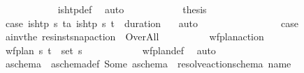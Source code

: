 \begin{isabellebody}
\ \ \ \ \ \ \ \ \ \ \isamarkupfalse%
\ is{\isacharunderscore}{\kern0pt}htp{\isacharunderscore}{\kern0pt}def\ \isamarkupfalse%
\ auto\isanewline
\ \ \ \ \ \ \ \ \isamarkupfalse%
\ \isamarkupfalse%
\ {\isacharquery}{\kern0pt}thesis\isanewline
\ \ \ \ \ \ \ \ \ \ \isamarkupfalse%
\ {\isacartoucheopen}{\isacharquery}{\kern0pt}case{}{\isacartoucheclose}\ {\isacartoucheopen}{\isasymnot}is{\isacharunderscore}{\kern0pt}htp\ {\isasympi}s\ t\isactrlsub a{\isacartoucheclose}\ {\isacartoucheopen}is{\isacharunderscore}{\kern0pt}htp\ {\isasympi}s\ {\isacharparenleft}{\kern0pt}t\isactrlsub {\isasympi}\ {\isacharplus}{\kern0pt}\ {\isacharparenleft}{\kern0pt}duration\ {\isasympi}{\isacharparenright}{\kern0pt}{\isacharparenright}{\kern0pt}{\isacartoucheclose}\ \isamarkupfalse%
\ auto\isanewline
\ \ \ \ \ \ \isamarkupfalse%
\isanewline
\ \ \ \ \ \ \ \ \isamarkupfalse%
\ {\isacharquery}{\kern0pt}case{}\isanewline
\ \ \ \ \ \ \ \ \isamarkupfalse%
\ {\isacharquery}{\kern0pt}a\isactrlsub i\isactrlsub n\isactrlsub v{\isacharequal}{\kern0pt}{\isachardoublequoteopen}the\ {\isacharparenleft}{\kern0pt}res{\isacharunderscore}{\kern0pt}inst{\isacharunderscore}{\kern0pt}snap{\isacharunderscore}{\kern0pt}action\ {\isasympi}\ Over{\isacharunderscore}{\kern0pt}All{\isacharparenright}{\kern0pt}{\isachardoublequoteclose}\isanewline
\ \ \ \ \ \ \ \ \isamarkupfalse%
\ {\isachardoublequoteopen}wf{\isacharunderscore}{\kern0pt}plan{\isacharunderscore}{\kern0pt}action\ {\isasympi}{\isachardoublequoteclose}\isanewline
\ \ \ \ \ \ \ \ \ \ \isamarkupfalse%
\ {\isacartoucheopen}wf{\isacharunderscore}{\kern0pt}plan\ {\isasympi}s{\isacartoucheclose}\ {\isacartoucheopen}{\isacharparenleft}{\kern0pt}t\isactrlsub {\isasympi}{\isacharcomma}{\kern0pt}{\isasympi}{\isacharparenright}{\kern0pt}\ {\isasymin}\ set\ {\isasympi}s{\isacartoucheclose}\isanewline
\ \ \ \ \ \ \ \ \ \ \isamarkupfalse%
\ wf{\isacharunderscore}{\kern0pt}plan{\isacharunderscore}{\kern0pt}def\ \isamarkupfalse%
\ auto\isanewline
\ \ \ \ \ \ \ \ \isamarkupfalse%
\ a\isactrlsub s\isactrlsub c\isactrlsub h\isactrlsub e\isactrlsub m\isactrlsub a\ \ a\isactrlsub s\isactrlsub c\isactrlsub h\isactrlsub e\isactrlsub m\isactrlsub a{\isacharunderscore}{\kern0pt}def{\isacharcolon}{\kern0pt}\ {\isachardoublequoteopen}Some\ a\isactrlsub s\isactrlsub c\isactrlsub h\isactrlsub e\isactrlsub m\isactrlsub a\ {\isacharequal}{\kern0pt}\ resolve{\isacharunderscore}{\kern0pt}action{\isacharunderscore}{\kern0pt}schema\ {\isacharparenleft}{\kern0pt}name\ {\isasympi}{\isacharparenright}{\kern0pt}{\isachardoublequoteclose}\isanewline

\end{isabellebody}
